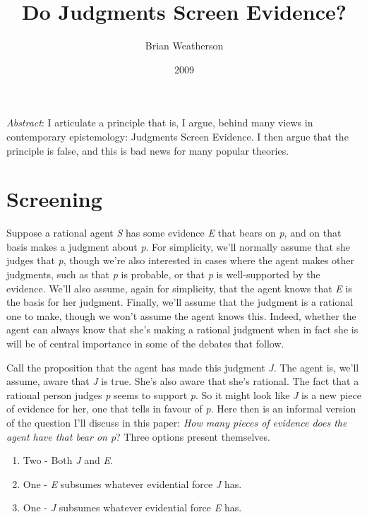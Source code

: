 \documentclass[
  11pt,
  letterpaper,
  DIV=11,
  numbers=noendperiod,
  twoside]{scrartcl}
\title{Do Judgments Screen Evidence?}
\author{Brian Weatherson}
\date{2009}
\providecommand{\tightlist}{%
  \setlength{\itemsep}{0pt}\setlength{\parskip}{0pt}}
\renewenvironment{abstract}
 {\vspace{-1.25cm}
 \quotation\small\noindent\emph{Abstract}:}
 {\endquotation}
\begin{document}
\maketitle
\begin{abstract}
I articulate a principle that is, I argue, behind many views in
contemporary epistemology: Judgments Screen Evidence. I then argue that
the principle is false, and this is bad news for many popular theories.
\end{abstract}


\section{Screening}\label{screening}

Suppose a rational agent \emph{S} has some evidence \emph{E} that bears
on \emph{p}, and on that basis makes a judgment about \emph{p}. For
simplicity, we'll normally assume that she judges that \emph{p}, though
we're also interested in cases where the agent makes other judgments,
such as that \emph{p} is probable, or that \emph{p} is well-supported by
the evidence. We'll also assume, again for simplicity, that the agent
knows that \emph{E} is the basis for her judgment. Finally, we'll assume
that the judgment is a rational one to make, though we won't assume the
agent knows this. Indeed, whether the agent can always know that she's
making a rational judgment when in fact she is will be of central
importance in some of the debates that follow.

Call the proposition that the agent has made this judgment \emph{J}. The
agent is, we'll assume, aware that \emph{J} is true. She's also aware
that she's rational. The fact that a rational person judges \emph{p}
seems to support \emph{p}. So it might look like \emph{J} is a new piece
of evidence for her, one that tells in favour of \emph{p}. Here then is
an informal version of the question I'll discuss in this paper:
\emph{How many pieces of evidence does the agent have that bear on p}?
Three options present themselves.

\begin{enumerate}
\def\labelenumi{\arabic{enumi}.}
\tightlist
\item
  Two - Both \emph{J} and \emph{E}.
\item
  One - \emph{E} subsumes whatever evidential force \emph{J} has.
\item
  One - \emph{J} subsumes whatever evidential force \emph{E} has.
\end{enumerate}
\end{document}
